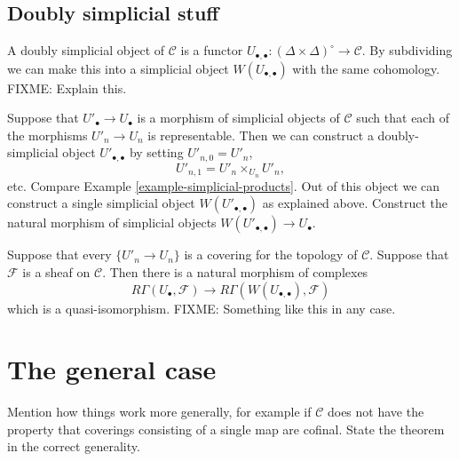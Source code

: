 \subsection{Doubly simplicial stuff}
\label{subsection-doubly-simplicial}

\noindent
A doubly simplicial object of $\mathcal{C}$ is a functor
$U_{\bullet,\bullet} : (\Delta\times\Delta)^\circ \to \mathcal{C}$.
By subdividing we can make this into a simplicial object 
$W(U_{\bullet,\bullet})$ with the same cohomology. FIXME: Explain this.

\noindent
Suppose that $U'_\bullet \to U_\bullet$ is a morphism of simplicial
objects of $\mathcal{C}$ such that each of the morphisms $U'_n \to
U_n$ is representable. Then we can construct a doubly-simplicial
object $U'_{\bullet,\bullet}$ by setting $U'_{n,0}= U'_n$,
$$
U'_{n,1} = U'_n \times_{U_n} U'_n,
$$
etc. Compare Example \ref{example-simplicial-products}. 
Out of this object we can construct a single simplicial object
$W(U'_{\bullet,\bullet})$ as explained above. Construct the 
natural morphism of simplicial objects 
$W(U'_{\bullet,\bullet}) \to U_\bullet$.

\begin{lemma}
Suppose that every $\{U'_n \to U_n\}$ is a covering for the topology
of $\mathcal{C}$. Suppose that $\mathcal{F}$ is a sheaf on 
$\mathcal{C}$. Then there is a natural
morphism of complexes
$$
R\Gamma(U_\bullet, \mathcal{F}) \to 
R\Gamma(W(U_{\bullet,\bullet}), \mathcal{F})
$$
which is a quasi-isomorphism. FIXME: Something like this in any case.
\end{lemma}

\section{The general case}

\noindent
Mention how things work more generally, for example if $\mathcal{C}$
does not have the property that coverings consisting of a single map
are cofinal. State the theorem in the correct generality.







